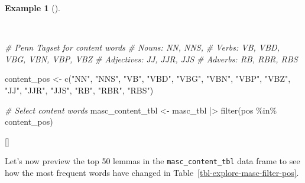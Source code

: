\documentclass[
  letterpaper,
  krantz1]{latex/krantz-mod}
\newenvironment{Shaded}{\begin{snugshade}}{\end{snugshade}}
\newcommand{\CommentTok}[1]{\textcolor[rgb]{0.00,0.00,0.00}{\textit{#1}}}
\newcommand{\FunctionTok}[1]{\textcolor[rgb]{0.00,0.00,0.00}{#1}}
\newcommand{\NormalTok}[1]{\textcolor[rgb]{0.00,0.00,0.00}{#1}}
\newcommand{\OtherTok}[1]{\textcolor[rgb]{0.00,0.00,0.00}{#1}}
\newcommand{\SpecialCharTok}[1]{\textcolor[rgb]{0.00,0.00,0.00}{#1}}
\newcommand{\StringTok}[1]{\textcolor[rgb]{0.00,0.00,0.00}{#1}}
\newcommand{\cindex}[1]{%
  \StrSubstitute{#1}{_}{\_}[\temp]%
  \index{\temp}%
}
\theoremstyle{definition}
\theoremstyle{definition}
\newtheorem{example}{Example}[chapter]
\theoremstyle{remark}
\begin{document}
\begin{example}[]\protect\hypertarget{exm-explore-masc-filter-pos}{}\label{exm-explore-masc-filter-pos}

~

\begin{Shaded}
\begin{Highlighting}[numbers=left,,]
\CommentTok{\# Penn Tagset for content words}
\CommentTok{\# Nouns: NN, NNS,}
\CommentTok{\# Verbs: VB, VBD, VBG, VBN, VBP, VBZ}
\CommentTok{\# Adjectives: JJ, JJR, JJS}
\CommentTok{\# Adverbs: RB, RBR, RBS}

\NormalTok{content\_pos }\OtherTok{\textless{}{-}} \FunctionTok{c}\NormalTok{(}\StringTok{"NN"}\NormalTok{, }\StringTok{"NNS"}\NormalTok{, }\StringTok{"VB"}\NormalTok{, }\StringTok{"VBD"}\NormalTok{, }\StringTok{"VBG"}\NormalTok{, }\StringTok{"VBN"}\NormalTok{, }\StringTok{"VBP"}\NormalTok{, }\StringTok{"VBZ"}\NormalTok{, }\StringTok{"JJ"}\NormalTok{, }\StringTok{"JJR"}\NormalTok{, }\StringTok{"JJS"}\NormalTok{, }\StringTok{"RB"}\NormalTok{, }\StringTok{"RBR"}\NormalTok{, }\StringTok{"RBS"}\NormalTok{)}

\CommentTok{\# Select content words}
\NormalTok{masc\_content\_tbl }\OtherTok{\textless{}{-}}
\NormalTok{  masc\_tbl }\SpecialCharTok{|\textgreater{}}
  \FunctionTok{filter}\NormalTok{(pos }\SpecialCharTok{\%in\%}\NormalTok{ content\_pos)}
\end{Highlighting}
\end{Shaded}

 \cindex{filter()}

\end{example}

Let's now preview the top 50 lemmas in the \texttt{masc\_content\_tbl}
data frame to see how the most frequent words have changed in
Table~\ref{tbl-explore-masc-filter-pos}.
\end{document}
